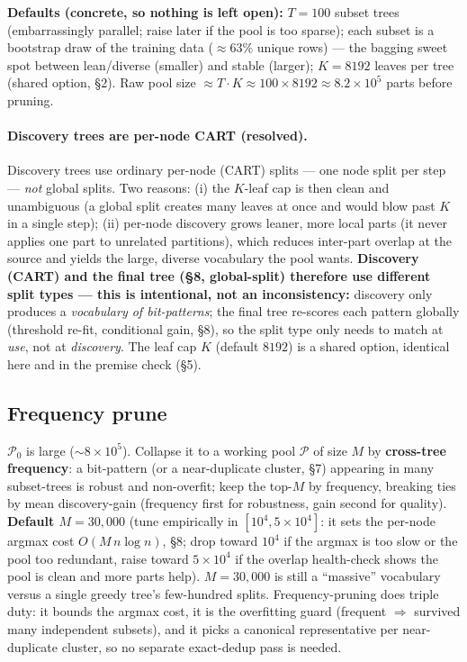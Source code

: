 \documentclass[11pt]{article}
\begin{document}
\textbf{Defaults (concrete, so nothing is left open):} $T=100$ subset trees (embarrassingly parallel; raise later if the pool is too sparse); each subset is a bootstrap draw of the training data ($\approx63\%$ unique rows) --- the bagging sweet spot between lean/diverse (smaller) and stable (larger); $K=8192$ leaves per tree (shared option, \S2). Raw pool size $\approx T\cdot K \approx 100\times 8192 \approx 8.2\times10^5$ parts before pruning.

\paragraph{Discovery trees are per-node CART (resolved).} Discovery trees use ordinary per-node (CART) splits --- one node split per step --- \emph{not} global splits. Two reasons: (i) the $K$-leaf cap is then clean and unambiguous (a global split creates many leaves at once and would blow past $K$ in a single step); (ii) per-node discovery grows leaner, more local parts (it never applies one part to unrelated partitions), which reduces inter-part overlap at the source and yields the large, diverse vocabulary the pool wants. \textbf{Discovery (CART) and the final tree (\S8, global-split) therefore use different split types --- this is intentional, not an inconsistency:} discovery only produces a \emph{vocabulary of bit-patterns}; the final tree re-scores each pattern globally (threshold re-fit, conditional gain, \S8), so the split type only needs to match at \emph{use}, not at \emph{discovery}. The leaf cap $K$ (default $8192$) is a shared option, identical here and in the premise check (\S5).


\subsection{Frequency prune}
$\mathcal{P}_0$ is large ($\sim8\times10^5$). Collapse it to a working pool $\mathcal{P}$ of size $M$ by \textbf{cross-tree frequency}: a bit-pattern (or a near-duplicate cluster, \S7) appearing in many subset-trees is robust and non-overfit; keep the top-$M$ by frequency, breaking ties by mean discovery-gain (frequency first for robustness, gain second for quality). \textbf{Default $M=30{,}000$} (tune empirically in $[10^4,5\!\times\!10^4]$: it sets the per-node argmax cost $O(M\,n\log n)$, \S8; drop toward $10^4$ if the argmax is too slow or the pool too redundant, raise toward $5\!\times\!10^4$ if the overlap health-check shows the pool is clean and more parts help). $M=30{,}000$ is still a ``massive'' vocabulary versus a single greedy tree's few-hundred splits. Frequency-pruning does triple duty: it bounds the argmax cost, it is the overfitting guard (frequent $\Rightarrow$ survived many independent subsets), and it picks a canonical representative per near-duplicate cluster, so no separate exact-dedup pass is needed.
\end{document}
